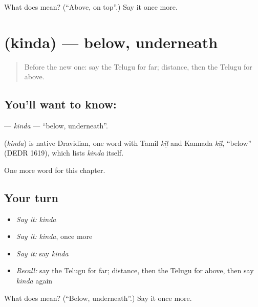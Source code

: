 \begin{tcolorbox}[breakable,colback=teal!4,colframe=teal!35!black,title={Before you move on}]
What does  mean? (\textquotedblleft{}Above, on top\textquotedblright{}.) Say it once more.
\end{tcolorbox}
\section[\texorpdfstring{\te{కింద} (kinda)}{కింద (kinda)}]{ (kinda) — below, underneath}

\label{lesson:TE-C101-kinda}



\begin{quote}
Before the new one: say the Telugu for far; distance, then the Telugu for above.
\end{quote}

\subsection*{You'll want to know: }
\textbf{} — \emph{kinda} — \textquotedblleft{}below, underneath\textquotedblright{}.

\begin{cousinweb}
\textbf{} (\emph{kinda}) is native Dravidian, one word with Tamil \emph{kīḻ} and Kannada \emph{kīḻ}, \textquotedblleft{}below\textquotedblright{} (DEDR 1619), which lists \emph{kinda} itself.
\end{cousinweb}

\begin{grammarlens}[title={What you've built}]
One more word for this chapter.
\end{grammarlens}

\subsection*{Your turn}
\begin{itemize}
\raggedright
  \item \emph{Say it:} \emph{kinda}
  \item \emph{Say it:} \emph{kinda}, once more
  \item \emph{Say it:} say \emph{kinda}
  \item \emph{Recall:} say the Telugu for far; distance, then the Telugu for above, then say \emph{kinda} again
\end{itemize}

\begin{tcolorbox}[breakable,colback=teal!4,colframe=teal!35!black,title={Before you move on}]
What does  mean? (\textquotedblleft{}Below, underneath\textquotedblright{}.) Say it once more.
\end{tcolorbox}
